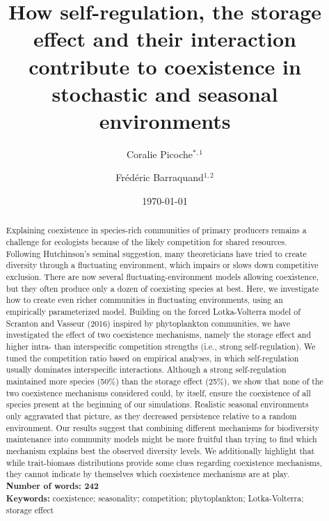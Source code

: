 \documentclass[smallcondensed,referee]{svjour3}       %
\begin{document}
\title{How self-regulation, the storage effect and their interaction contribute
to coexistence in stochastic and seasonal environments}
\date{\today}
\author{Coralie Picoche$^{*,1}$ \and Fr\'ed\'eric Barraquand$^{1,2}$}

\maketitle
 
\linenumbers
\begin{abstract}
Explaining coexistence in species-rich communities of primary producers
remains a challenge for ecologists because of the likely competition
for shared resources. Following Hutchinson's seminal
suggestion, many theoreticians have tried to create diversity through
a fluctuating environment, which impairs or slows down competitive
exclusion. There are now several fluctuating-environment models allowing
coexistence, but they often produce only a dozen of coexisting species
at best. Here, we investigate how to create even richer communities
in fluctuating environments, using an empirically parameterized model.
Building on the forced Lotka-Volterra model of Scranton and Vasseur
(2016) inspired by phytoplankton communities, we have investigated
the effect of two coexistence mechanisms, namely the storage effect
and higher intra- than interspecific competition strengths (i.e.,
strong self-regulation). We tuned the competition ratio based on empirical
analyses, in which self-regulation usually dominates interspecific
interactions. Although a strong self-regulation maintained more species
(50\%) than the storage effect (25\%), we show that none of the two
coexistence mechanisms considered could, by itself, ensure the coexistence
of all species present at the beginning of our simulations. Realistic
seasonal environments only aggravated that picture, as they decreased
persistence relative to a random environment. Our results suggest
that combining different mechanisms for biodiversity maintenance into
community models might be more fruitful than trying to find which
mechanism explains best the observed diversity levels. We additionally
highlight that while trait-biomass distributions provide some clues
regarding coexistence mechanisms, they cannot indicate by themselves
which coexistence mechanisms are at play. \\
\textbf{Number of words: 242}\\
\textbf{Keywords: }coexistence; seasonality; competition; phytoplankton;
Lotka-Volterra; storage effect\\
\end{abstract}
\end{document}
